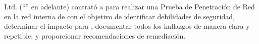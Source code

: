 \qquad\enterpriseName Ltd. (“\enterpriseName” en adelante) contrató a \brandName para realizar una Prueba de Penetración de Red en la red interna de \enterpriseName con el objetivo de identificar debilidades de seguridad, determinar el impacto para \enterpriseName, documentar todos los hallazgos de manera clara y repetible, y proporcionar recomendaciones de remediación.
